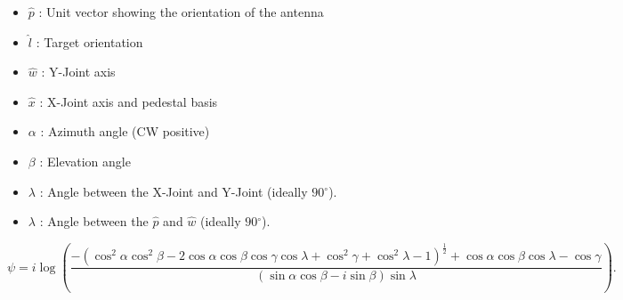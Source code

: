 \documentclass[a4paper]{article}
\newcommand{\dg}{\ensuremath{^{\circ}}}
\begin{document}
\begin{itemize}
    \item $\hat p$ : Unit vector showing the orientation of the antenna
    \item $\hat l$ : Target orientation
    \item $\hat w$ : Y-Joint axis
    \item $\hat x$ : X-Joint axis and pedestal basis
\end{itemize}

\begin{itemize}
    \item $\alpha$ : Azimuth angle (CW positive)
    \item $\beta$ : Elevation angle
    \item $\lambda$ : Angle between the X-Joint and Y-Joint (ideally $90\dg$).
    \item $\lambda$ : Angle between the $\hat p$ and $\hat w$ (ideally $90\dg$).
\end{itemize}

\begin{equation}
    \psi = i \log\left( \frac{ -(\cos^{2}{\alpha } \cos^{2}{\beta } - 2 \cos{\alpha } \cos{\beta } \cos{\gamma } \cos{\lambda } + \cos^{2}{\gamma } + \cos^{2}{\lambda } - 1)^{\frac{1}{2}} + \cos{\alpha } \cos{\beta } \cos{\lambda } - \cos{\gamma } } { (\sin{\alpha } \cos{\beta } - i \sin{\beta }) \sin{\lambda } } \right).
\end{equation}
\end{document}
